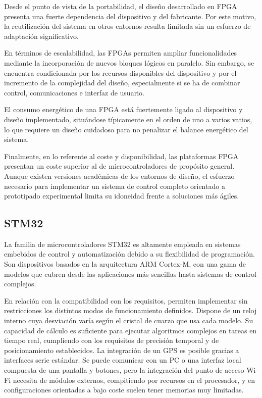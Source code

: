 Desde el punto de vista de la portabilidad, el diseño desarrollado en FPGA presenta una fuerte dependencia del dispositivo y del fabricante. Por este motivo, la reutilización del sistema en otros entornos resulta limitada sin un esfuerzo de adaptación significativo.

En términos de escalabilidad, las FPGAs permiten ampliar funcionalidades mediante la incorporación de nuevos bloques lógicos en paralelo. Sin embargo, se encuentra condicionada por los recursos disponibles del dispositivo y por el incremento de la complejidad del diseño, especialmente si se ha de combinar control, comunicaciones e interfaz de usuario.

El consumo energético de una FPGA está fuertemente ligado al dispositivo y diseño implementado, situándose típicamente en el orden de uno a varios vatios, lo que requiere un diseño cuidadoso para no penalizar el balance energético del sistema.

Finalmente, en lo referente al coste y disponibilidad, las plataformas FPGA presentan un coste superior al de microcontroladores de propósito general. Aunque existen versiones académicas de los entornos de diseño, el esfuerzo necesario para implementar un sistema de control completo orientado a prototipado experimental limita su idoneidad frente a soluciones más ágiles.


\subsection{STM32}
La familia de microcontroladores STM32 es altamente empleada en sistemas embebidos de control y automatización debido a su flexibilidad de programación. Son dispositivos basados en la arquitectura ARM Cortex-M, con una gama de modelos que cubren desde las aplicaciones más sencillas hasta sistemas de control complejos.

En relación con la compatibilidad con los requisitos, permiten implementar sin restricciones los distintos modos de funcionamiento definidos. Dispone de un reloj interno cuya desviación varía según el cristal de cuarzo que usa cada modelo. Su capacidad de cálculo es suficiente para ejecutar algoritmos complejos en tareas en tiempo real, cumpliendo con los requisitos de precisión temporal y de posicionamiento establecidos. La integración de un GPS es posible gracias a interfaces serie estándar. Se puede comunicar con un PC o una interfaz local compuesta de una pantalla y botones, pero la integración del punto de acceso Wi-Fi necesita de módulos externos, compitiendo por recursos en el procesador, y en configuraciones orientadas a bajo coste suelen tener memorias muy limitadas.

